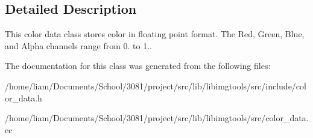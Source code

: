 \subsection{Detailed Description}
This color data class stores color in floating point format. The Red, Green, Blue, and Alpha channels range from 0. to 1.. 

The documentation for this class was generated from the following files\+:\begin{DoxyCompactItemize}
\item 
/home/liam/\+Documents/\+School/3081/project/src/lib/libimgtools/src/include/color\+\_\+data.\+h\item 
/home/liam/\+Documents/\+School/3081/project/src/lib/libimgtools/src/color\+\_\+data.\+cc\end{DoxyCompactItemize}
